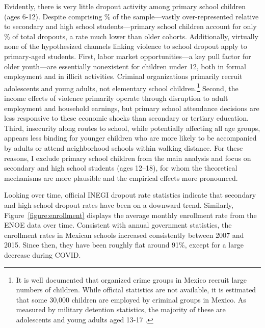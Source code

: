 \documentclass[12pt,letter,english,intoc,bibliography=totoc,index=totoc,BCOR10mm,captions=tableheading,nottitlepage,fleqn]{article}
\theoremstyle{break}
\begin{document}
Evidently, there is very little dropout activity among primary school children (ages 6-12). Despite comprising \pctPrimKids \% of the sample---vastly over-represented relative to secondary and high school students---primary school children account for only \pctPrimDropouts \% of total dropouts, a rate much lower than older cohorts. Additionally, virtually none of the hypothesized channels linking violence to school dropout apply to primary-aged students. First, labor market opportunities---a key pull factor for older youth---are essentially nonexistent for children under 12, both in formal employment and in illicit activities. Criminal organizations primarily recruit adolescents and young adults, not elementary school children.\footnote{It is well documented that organized crime groups in Mexico recruit large numbers of children. While official statistics are not available, it is estimated that some 30,000 children are employed by criminal groups in Mexico. As measured by military detention statistics, the majority of these are adolescents and young adults aged 13-17 \citep{redim2011}.} Second, the income effects of violence primarily operate through disruption to adult employment and household earnings, but primary school attendance decisions are less responsive to these economic shocks than secondary or tertiary education. Third, insecurity along routes to school, while potentially affecting all age groups, appears less binding for younger children who are more likely to be accompanied by adults or attend neighborhood schools within walking distance. For these reasons, I exclude primary school children from the main analysis and focus on secondary and high school students (ages 12--18), for whom the theoretical mechanisms are more plausible and the empirical effects more pronounced. 

Looking over time, official INEGI dropout rate statistics indicate that secondary and high school dropout rates have been on a downward trend. Similarly, Figure~\ref{figure:enrollment} displays the average monthly enrollment rate from the ENOE data over time. Consistent with annual government statistics, the enrollment rates in Mexican schools increased consistently between 2007 and 2015. Since then, they have been roughly flat around 91\%, except for a large decrease during COVID. 
\end{document}
